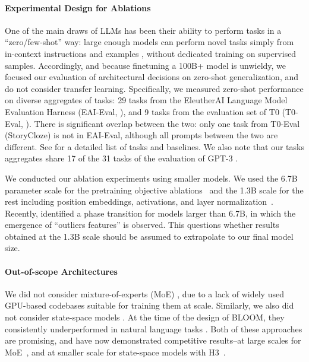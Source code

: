 \paragraph{Experimental Design for Ablations}

One of the main draws of LLMs has been their ability to perform tasks in a ``zero/few-shot'' way: large enough models can perform novel tasks simply from in-context instructions and examples \citep{radford2019language}, without dedicated training on supervised samples. Accordingly, and because finetuning a 100B+ model is unwieldy, we focused our evaluation of architectural decisions on zero-shot generalization, and do not consider transfer learning. Specifically, we measured zero-shot performance on diverse aggregates of tasks: 29 tasks from the EleutherAI Language Model Evaluation Harness (EAI-Eval, \cite{eval-harness}), and 9 tasks from the evaluation set of T0 (T0-Eval, \cite{sanh2022multitask}). There is significant overlap between the two: only one task from T0-Eval (StoryCloze) is not in EAI-Eval, although all prompts between the two are different. See \citet{scao2022what} for a detailed list of tasks and baselines. We also note that our tasks aggregates share 17 of the 31 tasks of the evaluation of GPT-3 \citep{brown2020language}.

We conducted our ablation experiments using smaller models. We used the 6.7B parameter scale for the pretraining objective ablations~\citep{wang2022what} and the 1.3B scale for the rest including position embeddings, activations, and layer normalization~\citep{scao2022what}. Recently, \citet{dettmers2022llm} identified a phase transition for models larger than 6.7B, in which the emergence of ``outliers features'' is observed. This questions whether results obtained at the 1.3B scale should be assumed to extrapolate to our final model size.

\paragraph{Out-of-scope Architectures}

We did not consider mixture-of-experts (MoE) \citep{shazeer2017}, due to a lack of widely used GPU-based codebases suitable for training them at scale. Similarly, we also did not consider state-space models \citep{gu2020hippo}. At the time of the design of BLOOM, they consistently underperformed in natural language tasks \citep{gu2021efficiently}. Both of these approaches are promising, and have now demonstrated competitive results--at large scales for MoE~\citep{fedus2022switch, srivastava2022beyond}, and at smaller scale for state-space models with H3~\citep{fu2023hungry}. 

